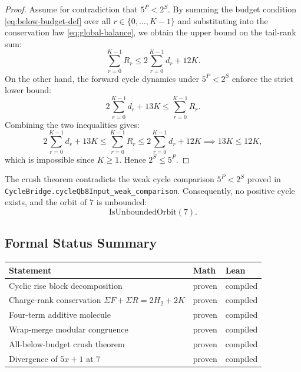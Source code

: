 \begin{proof}
Assume for contradiction that $5^P < 2^S$.
By summing the budget condition \eqref{eq:below-budget-def} over all $r\in\{0,\dots,K-1\}$ and substituting into the conservation law \eqref{eq:global-balance}, we obtain the upper bound on the tail-rank sum:
\begin{equation*}
  \sum_{r=0}^{K-1} R_r \le 2 \sum_{r=0}^{K-1} d_r + 12K.
\end{equation*}
On the other hand, the forward cycle dynamics under $5^P < 2^S$ enforce the strict lower bound:
\begin{equation*}
  2 \sum_{r=0}^{K-1} d_r + 13K \le \sum_{r=0}^{K-1} R_r.
\end{equation*}
Combining the two inequalities gives:
\begin{equation*}
  2 \sum_{r=0}^{K-1} d_r + 13K \le \sum_{r=0}^{K-1} R_r \le 2 \sum_{r=0}^{K-1} d_r + 12K \implies 13K \le 12K,
\end{equation*}
which is impossible since $K\ge 1$.  Hence $2^S \le 5^P$.
\end{proof}

\begin{corollary}\label{cor:final-div}
The crush theorem  contradicts the weak cycle comparison $5^P < 2^S$ proved in \texttt{CycleBridge.cycleQb8Input\_weak\_comparison}.  Consequently, no positive cycle exists, and the orbit of $7$ is unbounded:
\begin{equation*}
  \mathrm{IsUnboundedOrbit}(7).
\end{equation*}
\end{corollary}

\subsection{Formal Status Summary}

\begin{center}
\begin{tabular}{lll}
\toprule
Statement & Math & Lean \\
\midrule
Cyclic rise block decomposition & proven & compiled \\
Charge-rank conservation $\Sigma F + \Sigma R = 2H_2 + 2K$ & proven & compiled \\
Four-term additive molecule & proven & compiled \\
Wrap-merge modular congruence & proven & compiled \\
All-below-budget crush theorem & proven & compiled \\
Divergence of $5x+1$ at $7$ & proven & compiled \\
\bottomrule
\end{tabular}
\end{center}
